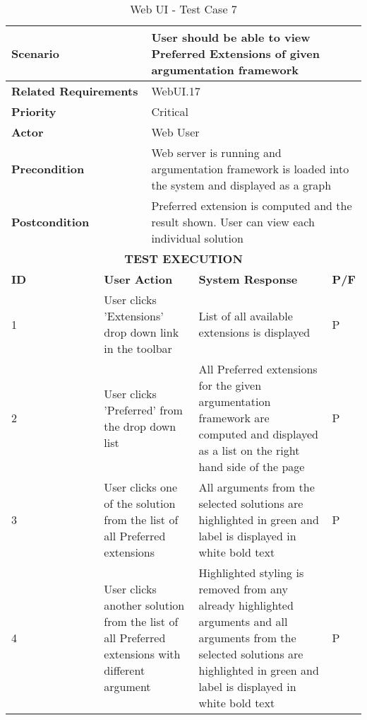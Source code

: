 \begin{longtable}[c]{p{}|p{}|p{}|p{}|p{}}
	\caption{Web UI - Test Case 7}
	\label{table:testcase7} \\
	\hline
	\multicolumn{2}{p{0.3\textwidth}}{\textbf{Scenario}} & \multicolumn{3}{p{0.7\textwidth}}{User should be able to view Preferred Extensions of given argumentation framework} \\ 
	\hline
	\endfirsthead
	\endhead
	\multicolumn{2}{p{0.4\textwidth}}{\textbf{Related Requirements}} & \multicolumn{3}{p{0.6\textwidth}}{WebUI.17} \\ 
	\hline
	\multicolumn{2}{p{0.4\textwidth}}{\textbf{Priority}} & \multicolumn{3}{p{0.6\textwidth}}{Critical} \\ 
	\hline
	\multicolumn{2}{p{0.3\textwidth}}{\textbf{Actor}} & \multicolumn{3}{p{0.7\textwidth}}{Web User} \\ 
	\hline
	\multicolumn{2}{p{0.3\textwidth}}{\textbf{Precondition}} & \multicolumn{3}{p{0.7\textwidth}}{Web server is running and argumentation framework is loaded into the system and displayed as a graph} \\ 
	\hline
	\multicolumn{2}{p{0.3\textwidth}}{\textbf{Postcondition}} & \multicolumn{3}{p{0.7\textwidth}}{Preferred extension is computed and the result shown. User can view each individual solution} \\ 
	\hline
	\multicolumn{5}{c}{\cellcolor{grey}\textbf{TEST EXECUTION}} \\ 
	\hline
	\textbf{ID} & \multicolumn{2}{|p{0.4\textwidth}|}{\textbf{User Action}} & \textbf{System Response} & \textbf{P/F} \\ 
	\hline
	1 & \multicolumn{2}{|p{0.4\textwidth}|}{User clicks 'Extensions' drop down link in the toolbar} & List of all available extensions is displayed & P \\ 
	\hline
	2 & \multicolumn{2}{|p{0.4\textwidth}|}{User clicks 'Preferred' from the drop down list} & All Preferred extensions for the given argumentation framework are computed and displayed as a list on the right hand side of the page & P \\ 
	\hline
	3 & \multicolumn{2}{|p{0.4\textwidth}|}{User clicks one of the solution from the list of all Preferred extensions} & All arguments from the selected solutions are highlighted in green and label is displayed in white bold text & P \\ 
	\hline
	4 & \multicolumn{2}{|p{0.4\textwidth}|}{User clicks another solution from the list of all Preferred extensions with different argument} & Highlighted styling is removed from any already highlighted arguments and all arguments from the selected solutions are highlighted in green and label is displayed in white bold text & P \\ 
	\hline
\end{longtable}

